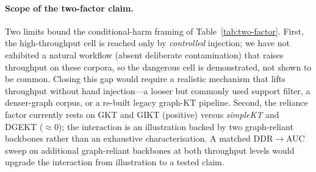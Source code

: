 \documentclass[pdflatex,sn-mathphys-num]{sn-jnl}
\newcommand{\DDR}{\textsc{DDR}}
\newenvironment{revbox}{}{}
\begin{document}
\begin{revbox}
\paragraph{Scope of the two-factor claim.}
Two limits bound the conditional-harm framing of Table~\ref{tab:two-factor}.
First, the high-throughput cell is reached only by \emph{controlled} injection;
we have not exhibited a natural workflow (absent deliberate contamination) that
raises throughput on these corpora, so the dangerous cell is demonstrated, not
shown to be common. Closing this gap would require a realistic mechanism that
lifts throughput without hand injection---a looser but commonly used support
filter, a denser-graph corpus, or a re-built legacy graph-KT pipeline. Second,
the reliance factor currently rests on GKT and GIKT (positive) versus
\textit{simpleKT} and DGEKT (${\approx}0$); the interaction is an illustration
backed by two graph-reliant backbones rather than an exhaustive
characterisation. A matched \DDR{}$\to$AUC sweep on additional graph-reliant
backbones at both throughput levels would upgrade the interaction from
illustration to a tested claim.
\end{revbox}
\end{document}
